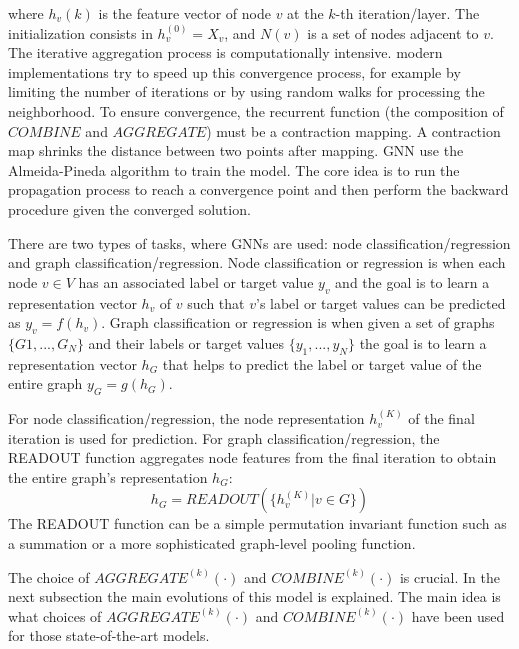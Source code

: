where $h_v(k)$ is the feature vector of node $v$ at the $k$-th iteration/layer. The initialization consists in $h_v^{(0)} = X_v$, and $N(v)$ is a set of nodes adjacent to $v$. 
The iterative aggregation process is computationally intensive. modern implementations try to speed up this convergence process, for example by limiting the number of iterations or by using random walks for processing the neighborhood.  To ensure convergence, the recurrent function (the composition of $COMBINE$ and $AGGREGATE$) must be a contraction mapping. A contraction map shrinks the distance between two points after mapping. GNN use the Almeida-Pineda algorithm \cite{AlmeidaPineda} to train the model. The core idea is to run the propagation process to reach a convergence point and then perform the backward procedure given the converged solution.

There are two types of tasks, where GNNs are used: node classification/regression and graph classification/regression.  Node classification or regression is when each node $v \in V$ has an associated label or target value $y_v$ and the goal is to learn a representation vector $h_v$ of $v$ such that $v$'s label or target values can be predicted as $y_v=f(h_v)$. Graph classification or regression is when given a set of graphs $\{ G1, ..., G_N\}$ and their labels or target values $\{y_1,...,y_N\}$ the goal is to learn a representation vector $h_G$ that helps to predict the label or target value of the entire graph $y_G=g(h_G)$.

For node classification/regression, the node representation $h_v^{(K)}$ of the final iteration is used for prediction. For graph classification/regression, the READOUT function aggregates node features from the final iteration to obtain the entire graph's representation $h_G$:
$$h_G = READOUT(\{h_v^{(K)} | v \in G\})$$
The READOUT function can be a simple permutation invariant function such as a summation or a more sophisticated graph-level pooling function.

The choice of $AGGREGATE^{(k)}(\cdot)$ and $COMBINE^{(k)}(\cdot)$ is crucial. In the next subsection the main evolutions of this model is explained. The main idea is what choices of $AGGREGATE^{(k)}(\cdot)$ and $COMBINE^{(k)}(\cdot)$  have been used for those state-of-the-art models. 


